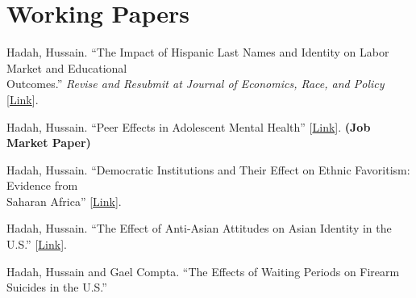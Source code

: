 \documentclass[letterpaper]{article}
\renewenvironment{itemize}{
  \begin{list}{}{
    \setlength{\leftmargin}{1.5em}
  }
}{
  \end{list}
}
\begin{document}
\section*{Working Papers}
\vspace{2 mm}
\begin{itemize}
  \item Hadah, Hussain. ``The Impact of Hispanic Last Names and Identity on Labor Market and Educational \\{\makebox[4mm]{\hfill}} Outcomes.'' \textit{Revise and Resubmit at Journal of Economics, Race, and Policy} [\href{https://dx.doi.org/10.2139/ssrn.4566234}{Link}].
  \item Hadah, Hussain. ``Peer Effects in Adolescent Mental Health'' [\href{https://hhadah.github.io/Depression_Idea/my_paper/Hadah-Peer-Effect-Depression.pdf}{Link}]. \textbf{(Job Market Paper)}
  \item Hadah, Hussain. ``Democratic Institutions and Their Effect on Ethnic Favoritism: Evidence from \\{\makebox[4mm]{\hfill}} Saharan Africa'' [\href{https://dx.doi.org/10.2139/ssrn.4566225}{Link}].
  \item Hadah, Hussain. ``The Effect of Anti-Asian Attitudes on Asian Identity in the U.S.'' [\href{https://hhadah.github.io/asian-identity-attrition/my_paper/submit_preprint.pdf}{Link}]. 
  \item Hadah, Hussain and Gael Compta. ``The Effects of Waiting Periods on Firearm Suicides in the U.S.''

\end{itemize}
\vspace{2 mm}
\end{document}
